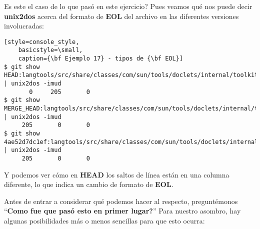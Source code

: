 Es este el caso de lo que pasó en este ejercicio? Pues veamos qué nos puede decir {\bf unix2dos} acerca del formato de {\bf EOL} del
archivo en las diferentes versiones involucradas:

\begin{lstlisting}[style=console_style,
	basicstyle=\small,
	caption={\bf Ejemplo 17} - tipos de {\bf EOL}]
$ git show HEAD:langtools/src/share/classes/com/sun/tools/doclets/internal/toolkit/resources/doclet.xml | unix2dos -imud
       0     205       0
$ git show MERGE_HEAD:langtools/src/share/classes/com/sun/tools/doclets/internal/toolkit/resources/doclet.xml | unix2dos -imud
     205       0       0
$ git show 4ae52d7dc1ef:langtools/src/share/classes/com/sun/tools/doclets/internal/toolkit/resources/doclet.xml | unix2dos -imud
     205       0       0
\end{lstlisting}

Y podemos ver cómo en {\bf HEAD} los saltos de línea están en una columna diferente, lo que indica un cambio de formato de {\bf EOL}.

Antes de entrar a considerar qué podemos hacer al respecto, preguntémonos ``{\bf Como fue que pasó esto en primer lugar?}'' Para nuestro
asombro, hay algunas posibilidades más o menos sencillas para que esto ocurra:


